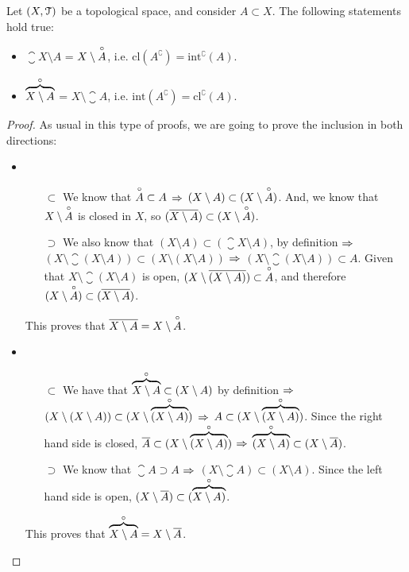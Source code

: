 \begin{theorem}
	\label{th:interior-closure-complement-relations}
	Let $(X,\EuScript{T})$ be a topological space, and consider $A\subset X$. The following statements hold true:
	\begin{itemize}
		\item $\closure{X\setminus A}$ = $X\setminus\overset{\circ}{A}$, i.e. $\mathrm{cl}(A^\complement)=\mathrm{int}^\complement(A)$.
		\item $\overbrace{X\setminus A}^{\circ}$ = $X\setminus\closure{A}$, i.e. $\mathrm{int}(A^\complement)=\mathrm{cl}^\complement(A)$.
	\end{itemize}
\end{theorem}
\begin{proof}
	As usual in this type of proofs, we are going to prove the inclusion in both directions:
\begin{itemize}
	\item \begin{itemize}
			  \item[$\boxed{\subset}$] We know that $\overset{\circ}{A}\subset A$ $\Rightarrow$ $(X\setminus A) \subset (X\setminus \overset{\circ}{A})$. And, we know that $X\setminus \overset{\circ}{A}$ is closed in $X$, so $(\overline{X\setminus A})\subset (X\setminus \overset{\circ}{A})$.
			  \item[$\boxed{\supset}$] We also know that $(X\setminus A) \subset (\closure{X\setminus A})$, by definition $\Rightarrow$ $(X\setminus \closure{(X\setminus A)}) \subset (X\setminus(X\setminus A))$ $\Rightarrow$ $(X\setminus \closure{(X\setminus A)})\subset A$. Given that $X\setminus \closure{(X\setminus A)}$ is open, $(X\setminus \overline{(X\setminus A)})\subset \overset{\circ}{A}$, and therefore $(X\setminus \overset{\circ}{A})\subset (\overline{X\setminus A})$.
	\end{itemize}
	This proves that $\overline{X\setminus A}=X\setminus \overset{\circ}{A}$.
	\item \begin{itemize}
			  \item[$\boxed{\subset}$] We have that $\overbrace{X\setminus A}^{\circ}\subset(X\setminus A)$ by definition $\Rightarrow$ $(X\setminus (X\setminus A))\subset (X\setminus\overbrace{(X\setminus A)}^{\circ})$ $\Rightarrow$ $A\subset (X\setminus\overbrace{(X\setminus A)}^{\circ})$. Since the right hand side is closed, $\overline{A}\subset (X\setminus\overbrace{(X\setminus A)}^{\circ})$ $\Rightarrow$ $\overbrace{(X\setminus A)}^{\circ}\subset (X\setminus\overline{A})$.
			  \item[$\boxed{\supset}$] We know that $\closure{A}\supset A$ $\Rightarrow$ $(X\setminus \closure{A})\subset (X\setminus A)$. Since the left hand side is open, $(X\setminus \overline{A})\subset (\overbrace{X\setminus A)}^{\circ}$.
	\end{itemize}
	This proves that $\overbrace{X\setminus A}^{\circ}=X\setminus \overline{A}$.
\end{itemize}
\end{proof}

